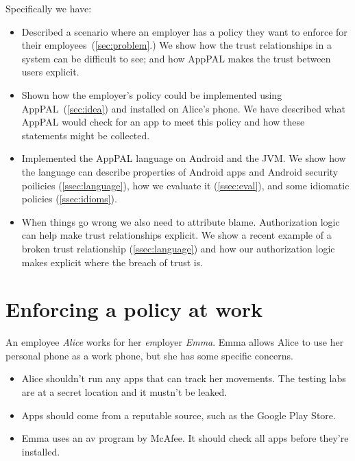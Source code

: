 \documentclass[]{llncs}
\begin{document}
Specifically we have:
\begin{itemize}
  \item
    Described a scenario where an employer has a policy they want to enforce for their employees~(\autoref{sec:problem}.)
    We show how the trust relationships in a system can be difficult to see;
      and how AppPAL makes the trust between users explicit.
  \item
    Shown how the employer's policy could be implemented using AppPAL~(\autoref{sec:idea}) and installed on Alice's phone.
    We have described what AppPAL would check for an app to meet this policy and how these statements might be collected.

  \item Implemented the AppPAL language on Android and the JVM.
    We show how the language can describe properties of Android apps and Android security poilicies (\autoref{ssec:language}),
      how we evaluate it (\autoref{ssec:eval}),
      and some idiomatic policies (\autoref{ssec:idioms}).

  \item When things go wrong we also need to attribute blame.
    Authorization logic can help make trust relationships explicit.
    We show a recent example of a broken trust relationship (\autoref{ssec:language})
    and how our authorization logic makes explicit where the breach of trust is.

\end{itemize}

\section{Enforcing a policy at work}
\label{sec:problem}

An employee \emph{Alice} works for her \emph{em\/}ployer \emph{Emma}.
Emma allows Alice to use her personal phone as a work phone, but she has some specific concerns.
\begin{itemize}
  \item Alice shouldn't run any apps that can track her movements.
    The testing labs are at a secret location and it mustn't be leaked.
  \item Apps should come from a reputable source, such as the Google Play Store.
  \item Emma uses an \ac{av} program by McAfee.
    It should check all apps before they're installed.
\end{itemize}
\end{document}
